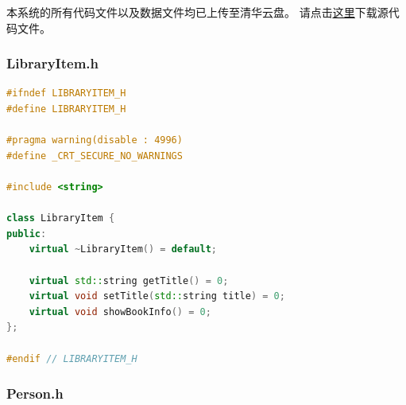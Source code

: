 \documentclass[12pt,twoside]{ctexart}
\begin{document}
\par
本系统的所有代码文件以及数据文件均已上传至清华云盘。
请点击\href{https://cloud.tsinghua.edu.cn/d/ce27972bcd2b428abddb/}{\underline{这里}}下载源代码文件。

\newpage
\subsubsection{LibraryItem.h}

\begin{lstlisting}[language=C++]
#ifndef LIBRARYITEM_H
#define LIBRARYITEM_H

#pragma warning(disable : 4996)
#define _CRT_SECURE_NO_WARNINGS

#include <string>

class LibraryItem {
public:
    virtual ~LibraryItem() = default;

    virtual std::string getTitle() = 0;
    virtual void setTitle(std::string title) = 0;
    virtual void showBookInfo() = 0;
};

#endif // LIBRARYITEM_H
\end{lstlisting}

\newpage
\subsubsection{Person.h}
\end{document}
